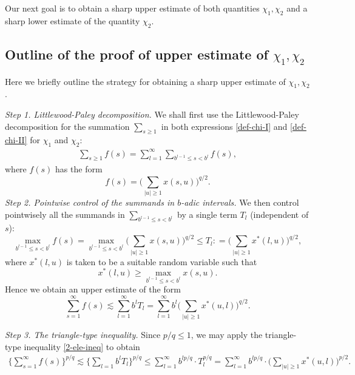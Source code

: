 \documentclass[12pt]{amsart}
\theoremstyle{definition}
\theoremstyle{remark}
\numberwithin{equation}{section}
\begin{document}
Our next goal is to obtain a sharp upper estimate of both quantities  $\chi_1, \chi_2$ and a sharp lower estimate of the quantity $\chi_2$.  






\subsection{Outline of the proof of upper estimate of $\chi_1, \chi_2$}\label{sec-outline}
Here we briefly outline the strategy for obtaining a sharp upper estimate of $\chi_1, \chi_2$. 


{\flushleft \it Step 1.  Littlewood-Paley decomposition.}
 We shall first use the Littlewood-Paley decomposition for the summation $\sum_{s\ge 1}$ in both expressions \eqref{def-chi-I} and \eqref{def-chi-II} for $\chi_1$ and $\chi_2$: 
\begin{align}\label{sum-sum}
\sum_{s\ge 1}  f(s) = \sum_{l=1}^\infty \sum_{b^{l-1}\le s < b^l}  f(s),
\end{align}
where $f(s)$ has the form 
\[
f(s) =\Big( \sum_{|u|\ge 1}  x(s, u) \Big)^{q/2}. 
\]
{\flushleft \it Step 2. Pointwise control of  the summands in $b$-adic intervals. }  
We  then control  pointwisely all the summands in $\sum_{b^{l-1}\le s< b^l}$ by a single term $T_l$ (independent of $s$): 
\[
  \max_{b^{l-1}\le s<b^l} f(s)  =     \max_{b^{l-1}\le s<b^l}    \Big( \sum_{|u|\ge 1}  x(s, u) \Big)^{q/2}  \le   T_l: =  \Big( \sum_{|u|\ge 1}   x^*(l, u) \Big)^{q/2},
\] 
where $x^*(l, u)$ is taken to be a suitable random variable such that 
\[
x^*(l, u) \ge  \max_{b^{l-1}\le s<b^l}    x(s, u). 
\]
Hence we obtain an upper estimate of the form
\[
\sum_{s=1}^\infty f(s) \lesssim \sum_{l=1}^\infty b^l T_l   =  \sum_{l=1}^\infty   b^l \Big(\sum_{|u|\ge 1} x^*(u, l) \Big)^{q/2}. 
\]




{\flushleft\it Step 3. The triangle-type inequality.}
Since  $p/q\le 1$, we may apply the triangle-type inequality \eqref{2-ele-ineq} to obtain 
\begin{align}\label{two-times}
\Big\{\sum_{s=1}^\infty f(s)\Big\}^{p/q}  \lesssim \Big\{\sum_{l=1} b^l T_l\Big\}^{p/q} \le  \sum_{l=1}^\infty b^{lp/q}  \cdot T_l^{p/q} =  \sum_{l=1}^\infty b^{lp/q}  \cdot \Big(\sum_{|u|\ge 1} x^*(u, l) \Big)^{p/2}. 
\end{align}
\end{document}
